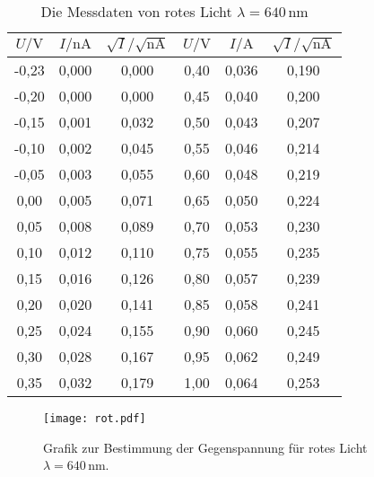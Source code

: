   \begin{table}[H]
    \centering
    \caption{Die Messdaten von rotes Licht $\lambda = 640 \,\text{nm}$ }
    \label{tab:rot}
    \begin{tabular}{| c | c |c||c|c|c| }
    \toprule
    $U/\mathrm{V}$ &$I/\mathrm{nA}$  &  $\sqrt{I}/\sqrt{\mathrm{nA}}$&$U/\mathrm{V}$ & $I/\mathrm{A} $& $\sqrt{I}/\sqrt{\mathrm{nA}}$  \\
    \midrule
    -0,23	& 0,000	& 0,000	& 0,40	& 0,036	 & 0,190\\
    -0,20	& 0,000	& 0,000	& 0,45	& 0,040	 & 0,200\\
    -0,15	& 0,001	& 0,032	& 0,50	& 0,043	 & 0,207\\
    -0,10	& 0,002	& 0,045	& 0,55	& 0,046	 & 0,214\\
    -0,05	& 0,003	& 0,055	& 0,60	& 0,048	 & 0,219\\
    0,00	& 0,005	& 0,071	& 0,65	& 0,050	 & 0,224\\
    0,05	& 0,008	& 0,089	& 0,70	& 0,053	 & 0,230\\
    0,10	& 0,012	& 0,110	& 0,75	& 0,055	 & 0,235\\
    0,15	& 0,016	& 0,126	& 0,80	& 0,057	 & 0,239\\
    0,20	& 0,020	& 0,141	& 0,85	& 0,058	 & 0,241\\
    0,25	& 0,024	& 0,155	& 0,90	& 0,060	 & 0,245\\
    0,30	& 0,028	& 0,167	& 0,95	& 0,062	 & 0,249\\
    0,35	& 0,032	& 0,179	& 1,00	& 0,064	 & 0,253\\
    \bottomrule
    \end{tabular}
  \end{table}
  \noindent
  \begin{figure}[H]
    \centering
    \texttt{[image: rot.pdf]}
    \caption{Grafik zur Bestimmung der Gegenspannung für rotes Licht $ \lambda = 640\, \text{nm}$.}
    \label{fig:rot}
  \end{figure}
  \noindent
